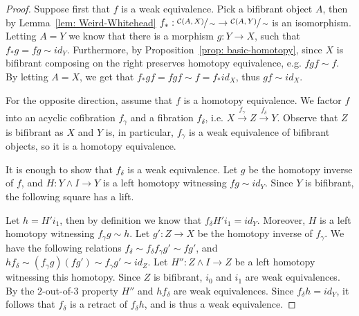 \documentclass[../thesis.tex]{subfiles}
\begin{document}
            \begin{proof}
                Suppose first that $f$ is a weak equivalence. Pick a bifibrant object $A$, then by Lemma~\ref{lem: Weird-Whitehead} $f_*:\sfrac{\mathcal{C}(A,X)}{\sim}\rightarrow \sfrac{\mathcal{C}(A,Y)}{\sim}$ is an isomorphism. Letting $A = Y$ we know that there is a morphism $g:Y\rightarrow X$, such that $f_*g = fg \sim id_Y$. Furthermore, by Proposition~\ref{prop: basic-homotopy}, since $X$ is bifibrant composing on the right preserves homotopy equivalence, e.g. $fgf \sim f$. By letting $A = X$, we get that $f_*gf = fgf \sim f = f_*id_X$, thus $gf \sim id_X$.

                For the opposite direction, assume that $f$ is a homotopy equivalence. We factor $f$ into an acyclic cofibration $f_\gamma$ and a fibration $f_\delta$, i.e. $X \overset{f_\gamma}{\rightarrow} Z \overset{f_\delta}{\rightarrow} Y$. Observe that $Z$ is bifibrant as $X$ and $Y$ is, in particular, $f_\gamma$ is a weak equivalence of bifibrant objects, so it is a homotopy equivalence. 

                It is enough to show that $f_\delta$ is a weak equivalence. Let $g$ be the homotopy inverse of $f$, and $H:Y\wedge I \rightarrow Y$ is a left homotopy witnessing $fg \sim id_Y$. Since $Y$ is bifibrant, the following square has a lift.
                \begin{center}
                \end{center}
                Let $h = H'i_1$, then by definition we know that $f_\delta H'i_1 = id_Y$. Moreover, $H$ is a left homotopy witnessing $f_\gamma g \sim h$. Let $g': Z\rightarrow X$ be the homotopy inverse of $f_\gamma$. We have the following relations $f_\delta \sim f_\delta f_\gamma g' \sim fg'$, and $hf_\delta \sim (f_\gamma g)(fg') \sim f_\gamma g' \sim id_Z$. Let $H'':Z\wedge I\rightarrow Z$ be a left homotopy witnessing this homotopy. Since $Z$ is bifibrant, $i_0$ and $i_1$ are weak equivalences. By the $2$-out-of-$3$ property $H''$ and $hf_\delta$ are weak equivalences. Since $f_\delta h = id_Y$, it follows that $f_\delta$ is a retract of $f_\delta h$, and is thus a weak equivalence.
            \end{proof}
\end{document}
